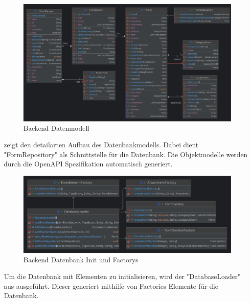 \begin{figure}[H]
    \centering
    \includegraphics[width=20cm,angle=90,origin=c]{images/classDiagrams/FormRepository}
    \caption{Backend Datenmodell}\label{fig:backendclass-diagram}
\end{figure}

 zeigt den detailarten Aufbau des Datenbankmodells.
Dabei dient "FormRepository" als Schnittstelle für die Datenbank.
Die Objektmodelle werden durch die OpenAPI Spezifikation automatisch generiert.

\begin{figure}[H]
    \centering
    \includegraphics[width=15cm]{images/classDiagrams/DatabaseLoader}
    \caption{Backend Datenbank Init und Factorys}\label{fig:backend-gen-class-diagram}
\end{figure}

Um die Datenbank mit Elementen zu initialisieren, wird der "DatabaseLoader" aus  ausgeführt.
Dieser generiert mithilfe von Factories Elemente für die Datenbank.

